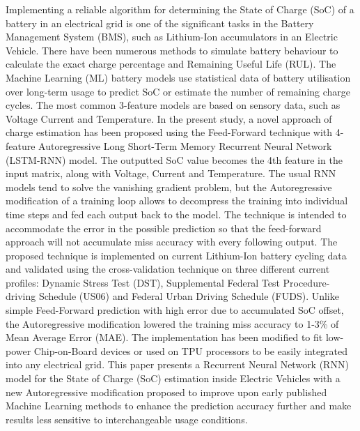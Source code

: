 %
 {
Implementing a reliable algorithm for determining the State of Charge (SoC) of a battery in an electrical grid is one of the significant tasks in the Battery Management System (BMS), such as Lithium-Ion accumulators in an Electric Vehicle.
There have been numerous methods to simulate battery behaviour to calculate the exact charge percentage and Remaining Useful Life (RUL).
The Machine Learning (ML) battery models use statistical data of battery utilisation over long-term usage to predict SoC or estimate the number of remaining charge cycles.
The most common 3-feature models are based on sensory data, such as Voltage Current and Temperature.
In the present study, a novel approach of charge estimation has been proposed using the Feed-Forward technique with 4-feature Autoregressive Long Short-Term Memory Recurrent Neural Network (LSTM-RNN) model.
The outputted SoC value becomes the 4th feature in the input matrix, along with Voltage, Current and Temperature.
The usual RNN models tend to solve the vanishing gradient problem, but the Autoregressive modification of a training loop allows to decompress the training into individual time steps and fed each output back to the model.
The technique is intended to accommodate the error in the possible prediction so that the feed-forward approach will not accumulate miss accuracy with every following output.
The proposed technique is implemented on current Lithium-Ion battery cycling data and validated using the cross-validation technique on three different current profiles: Dynamic Stress Test (DST), Supplemental Federal Test Procedure-driving Schedule (US06) and Federal Urban Driving Schedule (FUDS).
Unlike simple Feed-Forward prediction with high error due to accumulated  SoC offset, the Autoregressive modification lowered the training miss accuracy to 1-3\% of Mean Average Error (MAE).
The implementation has been modified to fit low-power Chip-on-Board devices or used on TPU processors to be easily integrated into any electrical grid.
}{
        This paper presents a Recurrent Neural Network (RNN) model for the State of Charge (SoC) estimation inside Electric Vehicles with a new Autoregressive modification proposed to improve upon early published Machine Learning methods to enhance the prediction accuracy further and make results less sensitive to interchangeable usage conditions.
}
